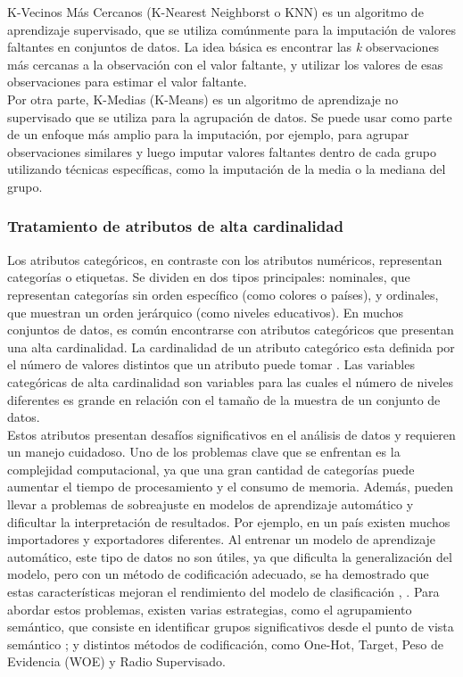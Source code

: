 K-Vecinos Más Cercanos (K-Nearest Neighborst o KNN) es un algoritmo de aprendizaje supervisado, que se utiliza comúnmente para la imputación de valores faltantes en conjuntos de datos. La idea básica es encontrar las \textit{k} observaciones más cercanas a la observación con el valor faltante, y utilizar los valores de esas observaciones para estimar el valor faltante. \\
Por otra parte, K-Medias (K-Means) es un algoritmo de aprendizaje no supervisado que se utiliza para la agrupación de datos. Se puede usar como parte de un enfoque más amplio para la imputación, por ejemplo, para agrupar observaciones similares y luego imputar valores faltantes dentro de cada grupo utilizando técnicas específicas, como la imputación de la media o la mediana del grupo.

\subsubsection*{Tratamiento de atributos de alta cardinalidad}\label{alta-cardinalidad}
Los atributos categóricos, en contraste con los atributos numéricos, representan categorías o etiquetas. Se dividen en dos tipos principales: nominales, que representan categorías sin orden específico (como colores o países), y ordinales, que muestran un orden jerárquico (como niveles educativos). En muchos conjuntos de datos, es común encontrarse con atributos categóricos que presentan una alta cardinalidad. La cardinalidad de un atributo categórico esta definida por el número de valores distintos que un atributo puede tomar \citep{moeyersoms2015including}. Las variables categóricas de alta cardinalidad son variables para las cuales el número de niveles diferentes es grande en relación con el tamaño de la muestra de un conjunto de datos. \\
Estos atributos presentan desafíos significativos en el análisis de datos y requieren un manejo cuidadoso. Uno de los problemas clave que se enfrentan es la complejidad computacional, ya que una gran cantidad de categorías puede aumentar el tiempo de procesamiento y el consumo de memoria. Además, pueden llevar a problemas de sobreajuste en modelos de aprendizaje automático y dificultar la interpretación de resultados. Por ejemplo, en un país existen muchos importadores y exportadores diferentes. Al entrenar un modelo de aprendizaje automático, este tipo de datos no son útiles, ya que dificulta la generalización del modelo, pero con un método de codificación adecuado, se ha demostrado que estas características mejoran el rendimiento del modelo de clasificación \citep{hooi2022feature}, \citep{cerda2020encoding}. Para abordar estos problemas, existen varias estrategias, como el agrupamiento semántico, que consiste en identificar grupos significativos desde el punto de vista semántico \citep{cerda2018similarity}; y distintos métodos de codificación, como One-Hot, Target, Peso de Evidencia (WOE) y Radio Supervisado. \\
